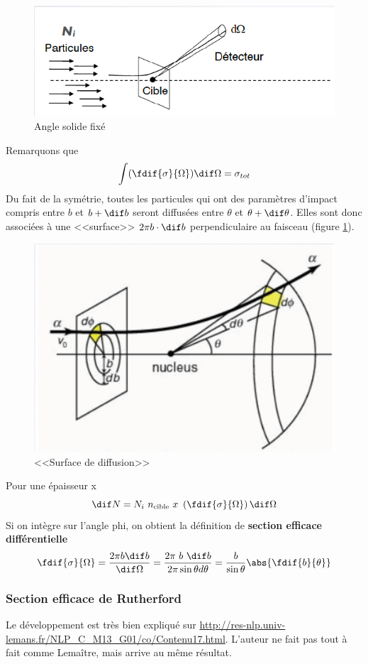 \begin{figure}[ht]
    \centering
    \includegraphics[scale=0.75]{Images1/anglesolide.PNG}
    \caption{Angle solide fixé}
\end{figure}
Remarquons que
\[
    \int(\fdif{\sigma}{\Omega})\dif \Omega=\sigma_{tot}
\]
Du fait de la symétrie, toutes les particules qui ont des paramètres d'impact compris entre $b$ et $b+\dif b$ seront diffusées entre $\theta$ et $\theta+\dif\theta$. Elles sont donc associées à une <<surface>> $2\pi b\cdot \dif b$ perpendiculaire au faisceau (figure \ref{fig:surface_de_diffusion}).
\begin{figure}[ht]
    \centering
    \includegraphics[scale=0.75]{Images1/surface_perp.PNG}
    \caption{<<Surface de diffusion>>}
    \label{fig:surface_de_diffusion}
\end{figure}
Pour une épaisseur x
\[
    \dif N=N_i~n_{\text{cible}}~x~\left(\fdif{\sigma}{\Omega}\right)\dif \Omega
\]
Si on intègre sur l'angle phi, on obtient la définition de \textbf{section efficace différentielle}
\[
    \fdif{\sigma}{\Omega}=\dfrac{2\pi b \dif b}{\dif \Omega}=\dfrac{2\pi~b~\dif b}{2\pi \sin{\theta}d\theta}=\dfrac{b}{\sin{\theta}}\abs{\fdif{b}{\theta}}
\]

\subsubsection{Section efficace de Rutherford}
Le développement est très bien expliqué sur \url{http://res-nlp.univ-lemans.fr/NLP_C_M13_G01/co/Contenu17.html}. L'auteur ne fait pas tout à fait comme Lemaître, mais arrive au même résultat.

